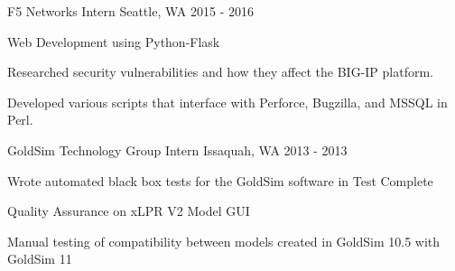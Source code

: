 \begin{cventries}
  \cventry
    {F5 Networks} %
    {Intern} %
    {Seattle, WA} %
    {2015 - 2016} %
    {
      \begin{cvitems} %
        \item {Web Development using Python-Flask}
        \item {Researched security vulnerabilities and how they affect the BIG-IP platform.}
        \item {Developed various scripts that interface with Perforce, Bugzilla, and MSSQL in Perl.}
      \end{cvitems}
    }

  \cventry
    {GoldSim Technology Group} %
    {Intern} %
    {Issaquah, WA} %
    {2013 - 2013} %
    {
      \begin{cvitems} %
        \item {Wrote automated black box tests for the GoldSim software in Test Complete}
        \item {Quality Assurance on xLPR V2 Model GUI}
        \item {Manual testing of compatibility between models created in GoldSim 10.5 with GoldSim 11}
      \end{cvitems}
    }

\end{cventries}
